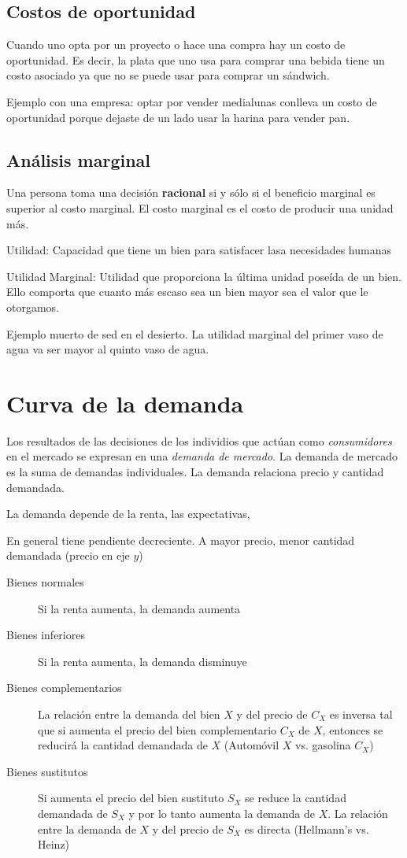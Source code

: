 \documentclass[twocolumn,10pt]{article}
\begin{document}
\subsection{Costos de oportunidad}

Cuando uno opta por un proyecto o hace una compra hay un costo de oportunidad. Es decir, la plata que uno usa para comprar una bebida tiene un costo asociado ya que no se puede usar para comprar un sándwich.

Ejemplo con una empresa: optar por vender medialunas conlleva un costo de oportunidad porque dejaste de un lado usar la harina para vender pan.

\subsection{An\'alisis marginal}
Una persona toma una decisión \textbf{racional} si y s\'olo si el beneficio marginal es superior al costo marginal. El costo marginal es el costo de producir una unidad m\'as.

Utilidad: Capacidad que tiene un bien para satisfacer lasa necesidades humanas

Utilidad Marginal: Utilidad que proporciona la \'ultima unidad pose\'ida de un bien. Ello comporta que cuanto m\'as escaso sea un bien mayor sea el valor que le otorgamos. 

Ejemplo muerto de sed en el desierto. La utilidad marginal del primer vaso de agua va ser mayor al quinto vaso de agua.
\section{Curva de la demanda}
Los resultados de las decisiones de los individios que act\'uan como \textit{consumidores} en el mercado se expresan en una \textit{demanda de mercado}. La demanda de mercado es la suma de demandas individuales. La demanda relaciona precio y cantidad demandada.

La demanda depende de la renta, las expectativas,

En general tiene pendiente decreciente. A mayor precio, menor cantidad demandada (precio en eje $y$)
\begin{description}
	\item[Bienes normales] Si la renta aumenta, la demanda aumenta
	\item[Bienes inferiores] Si la renta aumenta, la demanda disminuye
	\item[Bienes complementarios] La relación entre la demanda del bien $X$ y del precio de $C_X$ es inversa tal que si aumenta el precio del bien complementario $C_X$ de $X$, entonces se reducirá la cantidad demandada de $X$ (Automóvil $X$ vs. gasolina $C_X$)
	\item[Bienes sustitutos] Si aumenta el precio del bien sustituto $S_X$ se reduce la cantidad demandada de $S_X$ y por lo tanto aumenta la demanda de $X$. La relación entre la demanda de $X$ y del precio de $S_X$ es directa (Hellmann's vs. Heinz) 
\end{description}
\end{document}
